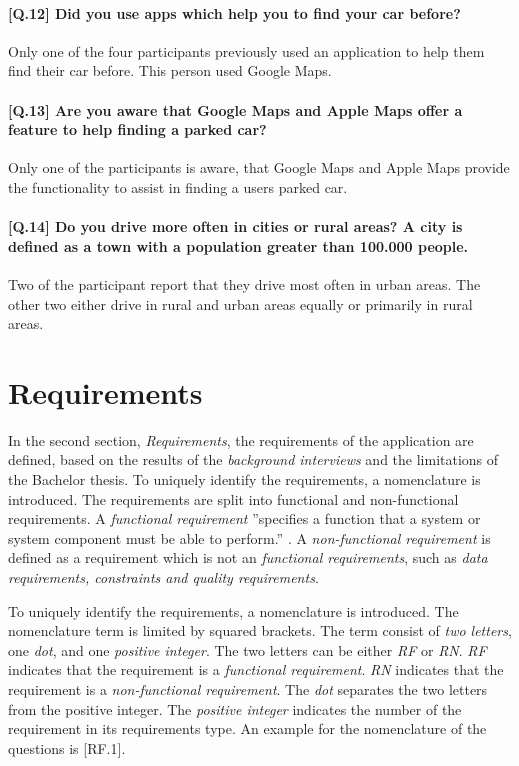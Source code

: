 \paragraph{[Q.12] Did you use apps which help you to find your car before?}
Only one of the four participants previously used an application to help them find their car before. This person used Google Maps.

\paragraph{[Q.13] Are you aware that Google Maps and Apple Maps offer a feature to help finding a parked car?}
Only one of the participants is aware, that Google Maps and Apple Maps provide the functionality to assist in finding a users parked car. 

\paragraph{[Q.14] Do you drive more often in cities or rural areas? A city is defined as a town with a population greater than 100.000 people.}
Two of the participant report that they drive most often in urban areas. The other two either drive in rural and urban areas equally or primarily in rural areas.


\section{Requirements}
In the second section, \textit{Requirements}, the requirements of the application are defined, based on the results of the \textit{background interviews} and the limitations of the Bachelor thesis. To uniquely identify the requirements, a nomenclature is introduced. The requirements are split into functional and non-functional requirements. A \textit{functional requirement} ''specifies a function that a system or system component must be able to perform.'' \cite{eide2005quantification}. A \textit{non-functional requirement} is defined as a requirement which is not an \textit{functional requirements}, such as \textit{data requirements, constraints and quality requirements}. \cite{eide2005quantification}

To uniquely identify the requirements, a nomenclature is introduced. The nomenclature term is limited by squared brackets. The term consist of \textit{two letters}, one \textit{dot}, and one \textit{positive integer}. The two letters can be either \textit{RF} or \textit{RN}. \textit{RF} indicates that the requirement is a \textit{functional requirement}. \textit{RN} indicates that the requirement is a \textit{non-functional requirement}. The \textit{dot} separates the two letters from the positive integer. The \textit{positive integer} indicates the number of the requirement in its requirements type. An example for the nomenclature of the questions is [RF.1].


